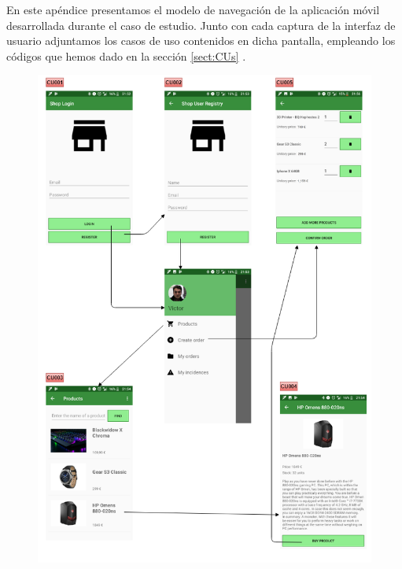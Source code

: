\documentclass[11pt,spanish,listoffigures]{tfgetsinf}
\begin{document}
En este apéndice presentamos el modelo de navegación de la aplicación móvil desarrollada durante el caso de estudio. Junto con cada captura de la interfaz de usuario adjuntamos los casos de uso contenidos en dicha pantalla, empleando los códigos que hemos dado en la sección \ref{sect:CUs} .

\begin{figure}[h]
\centering
\includegraphics[scale=0.6]{ModeloUI1}
\end{figure}
\end{document}
